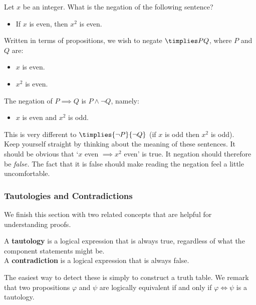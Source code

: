 \begin{example}
Let $x$ be an integer. What is the negation of the following sentence?
\begin{itemize}\setlength{\itemsep}{0pt}
  \item[] If $x$ is even, then $x^2$ is even.
\end{itemize}
Written in terms of propositions, we wish to negate $\timplies PQ$, where $P$ and $Q$ are:
\begin{itemize}\setlength{\itemsep}{0pt}
  \item[] $x$ is even.
  \item[] $x^2$ is even.
\end{itemize}
The negation of $P\implies Q$ is $P\wedge\neg Q$, namely:
\begin{itemize}\setlength{\itemsep}{0pt}
  \item[] $x$ is even and $x^2$ is odd.
\end{itemize}
This is very different to $\timplies{\neg P}{\neg Q}$ (if $x$ is odd then $x^2$ is odd).\\[5pt]
Keep yourself straight by thinking about the meaning of these sentences. It should be obvious that `$x$ even $\implies x^2$ even' is true. It negation should therefore be \emph{false.} The fact that it is false should make reading the negation feel a little uncomfortable.
\end{example}




\subsubsection*{Tautologies and Contradictions}

We finish this section with two related concepts that are helpful for understanding proofs.

\begin{defn}
A \textbf{tautology} is a logical expression that is always true, regardless of what the component statements might be.\\
A \textbf{contradiction} is a logical expression that is always false.
\end{defn}

\noindent The easiest way to detect these is simply to construct a truth table. We remark that two propositions $\varphi$ and $\psi$ are logically equivalent if and only if $\varphi \iff \psi$ is a tautology.

